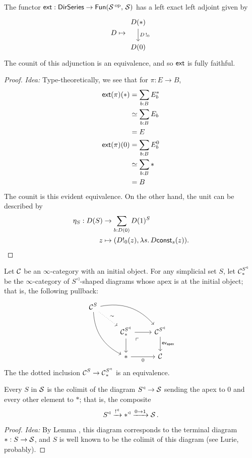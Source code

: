 \begin{prop}
The functor $\mathsf{{ext}} : \operatorname{\mathsf{{DirSeries}}} \to \operatorname{\mathsf{{Fun}}}(\operatorname{\mathcal{S}}\operatorname{^\text{op}},\, \operatorname{\mathcal{S}})$ has a left exact
left adjoint given by
$$D \mapsto \begin{tikzcd} D(\ast) \arrow[d, "D\bang_0"] \\ D(0) \end{tikzcd}$$
The counit of this adjunction is an equivalence, and so $\mathsf{{ext}}$ is fully faithful.
\end{prop}
\begin{proof}
\emph{Idea:} Type-theoretically, we see that for $\pi : E \to B$,
\begin{align*}
  \mathsf{{ext}}(\pi)(\ast) &= \sum_{b : B}E_b^\ast\\
  &\simeq \sum_{b : B} E_b\\
  &= E\\
  \mathsf{{ext}}(\pi)(0) &= \sum_{b : B}E_b^0\\
  &\simeq \sum_{b : B} \ast\\
    &= B
\end{align*}
The counit is this evident equivalence. On the other hand, the unit can be
described by
\begin{align*}
  \eta_S : D(S) &\to \sum_{b : D(0)} D(1)^S\\
  z &\mapsto (D!_0(z), \lambda {s}.\, D\mathsf{{const}}_s(z)).
\end{align*}
\end{proof}

\begin{lem}\label{lem:cone.initial.equivalence}
Let $\operatorname{\mathcal{C}}$ be an $\infty$-category with an initial object. For any simplicial set
$S$, let $\operatorname{\mathcal{C}}^{S^{\triangleleft}}_{\ast}$ be the $\infty$-category of
  $S^{\triangleleft}$-shaped diagrams whose apex is at the initial object; that
  is, the following pullback:
  \[
    \begin{tikzcd}
      \Ca^{S} \arrow[drr, bend left] \arrow[ddr, bend right] \arrow[dr,
      dotted, "\sim"] & & \\
      & \Ca^{S^{\triangleleft}}_{\ast} \arrow[d] \arrow[r] \arrow[dr, phantom,
      "\ulcorner" very near start] & \Ca^{S^{\triangleleft}} \arrow[d,
      "\term{ev}_{\term{apex}}"] \\
      & \ast \arrow[r, "0"'] & \Ca
    \end{tikzcd}
  \]
The the dotted inclusion $\operatorname{\mathcal{C}}^{S} \to \operatorname{\mathcal{C}}^{S^{\triangleleft}}_{\ast}$ is an equivalence.
\end{lem}

\begin{lem}\label{lem:every.type.weakly.contractible.colimit}
  Every $S$ in $\operatorname{\mathcal{S}}$ is the colimit of the diagram $S^{\triangleleft} \to \operatorname{\mathcal{S}}$
sending the apex to $0$ and every other element to $\ast$; that is, the
composite
$$S^{\triangleleft} \xrightarrow{\operatorname{!}^{\triangleleft}} \ast^{\triangleleft} \xrightarrow{0 \to
  1} \operatorname{\mathcal{S}}.$$
\end{lem}
\begin{proof}
\emph{Idea:} By Lemma \label{lem:cone.initial.equivalence}, this diagram
corresponds to the terminal diagram $\ast : S \to \operatorname{\mathcal{S}}$, and $S$ is well known to
be the colimit of this diagram (see Lurie, probably).
\end{proof}

